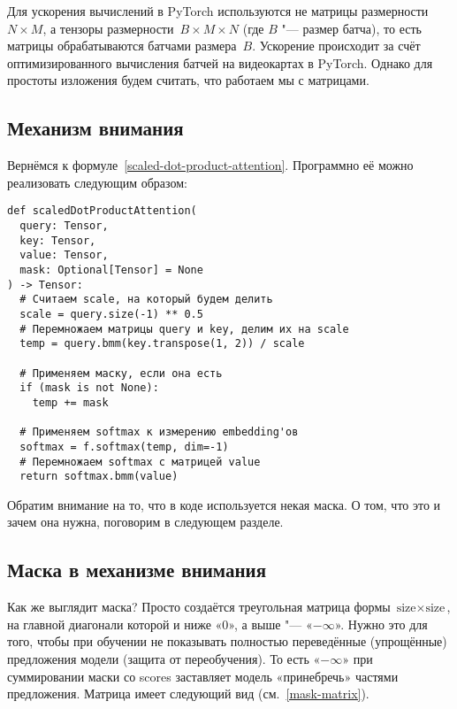 Для ускорения вычислений в PyTorch используются не матрицы размерности~$N \times M$, а тензоры размерности~$B \times M \times N$ (где $B$ "--- размер батча), то есть матрицы обрабатываются батчами размера~$B$. Ускорение происходит за счёт оптимизированного вычисления батчей на видеокартах в PyTorch. Однако для простоты изложения будем считать, что работаем мы с матрицами.


\subsection{Механизм внимания}


Вернёмся к формуле~\eqref{scaled-dot-product-attention}. Программно её можно реализовать следующим образом:

\begin{verbatim}
def scaledDotProductAttention(
  query: Tensor,
  key: Tensor,
  value: Tensor,
  mask: Optional[Tensor] = None
) -> Tensor:
  # Считаем scale, на который будем делить
  scale = query.size(-1) ** 0.5
  # Перемножаем матрицы query и key, делим их на scale
  temp = query.bmm(key.transpose(1, 2)) / scale

  # Применяем маску, если она есть
  if (mask is not None):
    temp += mask

  # Применяем softmax к измерению embedding'ов
  softmax = f.softmax(temp, dim=-1)
  # Перемножаем softmax с матрицей value
  return softmax.bmm(value)
\end{verbatim}

Обратим внимание на то, что в коде используется некая маска. О том, что это и зачем она нужна, поговорим в следующем разделе.


\subsection{Маска в механизме внимания}


Как же выглядит маска? Просто создаётся треугольная матрица формы $ \text{size} \times \text{size} $, на главной диагонали которой и ниже «$0$», а выше "--- «$-\infty$». Нужно это для того, чтобы при обучении не показывать полностью переведённые (упрощённые) предложения модели (защита от переобучения). То есть «$-\infty$» при суммировании маски со scores заставляет модель «принебречь» частями предложения. Матрица имеет следующий вид (см.~\eqref{mask-matrix}).


